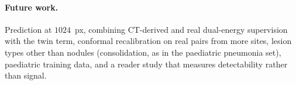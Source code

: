 \paragraph{Future work.} Prediction at $1024$~px, combining CT-derived and real dual-energy supervision with the twin term, conformal
recalibration on real pairs from more sites, lesion types other than nodules (consolidation, as in the paediatric pneumonia set), paediatric training data, and a
reader study that measures detectability rather than signal.
